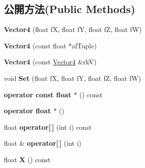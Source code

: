 \subsection*{公開方法(Public Methods)}
\begin{DoxyCompactItemize}
\item 
{\bfseries Vector4} (float fX, float fY, float fZ, float fW)\hypertarget{class_magnum_1_1_vector4_a80c4c9ec4c3fbe1db960ab2d50ac7f38}{}\label{class_magnum_1_1_vector4_a80c4c9ec4c3fbe1db960ab2d50ac7f38}

\item 
{\bfseries Vector4} (const float $\ast$af\+Tuple)\hypertarget{class_magnum_1_1_vector4_ab7e1fac4ee588eec192771b0f4651606}{}\label{class_magnum_1_1_vector4_ab7e1fac4ee588eec192771b0f4651606}

\item 
{\bfseries Vector4} (const \hyperlink{class_magnum_1_1_vector4}{Vector4} \&rkV)\hypertarget{class_magnum_1_1_vector4_a6819e126b0298f567d57cb3d4dd82e07}{}\label{class_magnum_1_1_vector4_a6819e126b0298f567d57cb3d4dd82e07}

\item 
void {\bfseries Set} (float fX, float fY, float fZ, float fW)\hypertarget{class_magnum_1_1_vector4_a50d7a5d66d775516293159b0db19e439}{}\label{class_magnum_1_1_vector4_a50d7a5d66d775516293159b0db19e439}

\item 
{\bfseries operator const float $\ast$} () const \hypertarget{class_magnum_1_1_vector4_a56f9fd544fcc3b124a5edbb26305cad2}{}\label{class_magnum_1_1_vector4_a56f9fd544fcc3b124a5edbb26305cad2}

\item 
{\bfseries operator float $\ast$} ()\hypertarget{class_magnum_1_1_vector4_ae128a91dc05ac7e453fc98ae26ea918a}{}\label{class_magnum_1_1_vector4_ae128a91dc05ac7e453fc98ae26ea918a}

\item 
float {\bfseries operator\mbox{[}$\,$\mbox{]}} (int i) const \hypertarget{class_magnum_1_1_vector4_a71172cb5daa1caeccd56ed8477f8298a}{}\label{class_magnum_1_1_vector4_a71172cb5daa1caeccd56ed8477f8298a}

\item 
float \& {\bfseries operator\mbox{[}$\,$\mbox{]}} (int i)\hypertarget{class_magnum_1_1_vector4_a2e9c6d075b3253c68e2240099ec2130e}{}\label{class_magnum_1_1_vector4_a2e9c6d075b3253c68e2240099ec2130e}

\item 
float {\bfseries X} () const \hypertarget{class_magnum_1_1_vector4_a4372bfdc22e45c020b105442f6b16c98}{}\label{class_magnum_1_1_vector4_a4372bfdc22e45c020b105442f6b16c98}


\end{DoxyCompactItemize}
